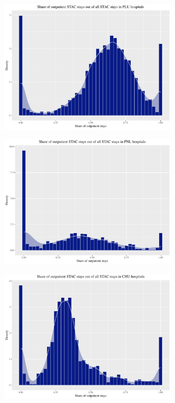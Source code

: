 \begin{figure}[!htb]
    \centering
    \includegraphics[width=0.8\textwidth]{../../Figures/2016-2022/STAC_share_PLU.pdf}
\end{figure}

\bigskip
\begin{figure}[!htb]
    \centering
    \includegraphics[width=0.8\textwidth]{../../Figures/2016-2022/STAC_share_PNL.pdf}
\end{figure}

\begin{figure}[!htb]
    \centering
    \includegraphics[width=0.8\textwidth]{../../Figures/2016-2022/STAC_share_CHU.pdf}
\end{figure}

